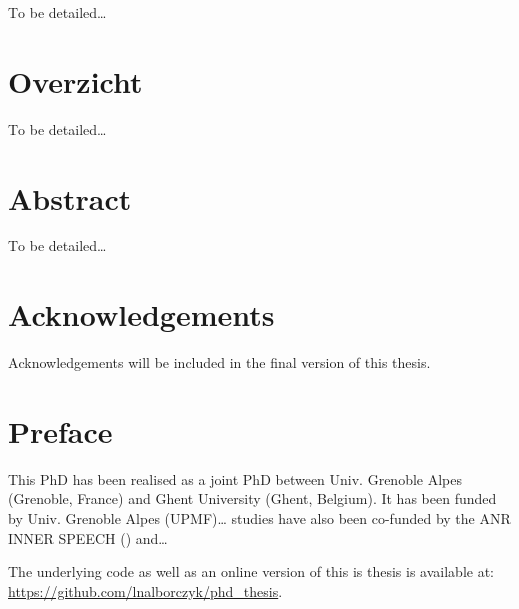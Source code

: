 \documentclass[a4paper,12pt,twoside,openright,oldfontcommands]{memoir}
\newcommand{\initial}[1]{
	\lettrine[lines=3,lhang=0.33,nindent=0em]{
		\color{gray}
     		{\textsc{#1}}}{}}
\newcommand\blankpage{%
    \null
    \thispagestyle{empty}%
    \newpage
    }
\begin{document}
\initial{T}o be detailed\ldots{}

\afterpage{\blankpage}

\chapter*{Overzicht}

\initial{T}o be detailed\ldots{}

\afterpage{\blankpage}

\chapter*{Abstract}

\initial{T}o be detailed\ldots{}

\afterpage{\blankpage}

\chapter*{Acknowledgements}

\initial{A}cknowledgements will be included in the final version of this
thesis.

\afterpage{\blankpage}

\chapter*{Preface}

\initial{T}his PhD has been realised as a joint PhD between Univ.
Grenoble Alpes (Grenoble, France) and Ghent University (Ghent, Belgium).
It has been funded by Univ. Grenoble Alpes (UPMF)\ldots{} studies have
also been co-funded by the ANR INNER SPEECH () and\ldots{}

The underlying code as well as an online version of this is thesis is
available at: \url{https://github.com/lnalborczyk/phd_thesis}.

\newpage

\blankpage

\renewcommand{\contentsname}{Table of contents}

 \tableofcontents*
{}
\newpage

\listoftables
{}
\newpage
\end{document}
